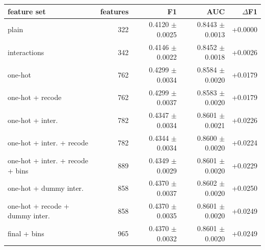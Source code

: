 \begin{tabular}{lrrrr}
\toprule
feature set & features & F1 & AUC & $\Delta$F1 \\
\midrule
plain & 322 & 0.4120 $\pm$ 0.0025 & 0.8443 $\pm$ 0.0013 & +0.0000 \\
interactions & 342 & 0.4146 $\pm$ 0.0022 & 0.8452 $\pm$ 0.0018 & +0.0026 \\
one-hot & 762 & 0.4299 $\pm$ 0.0034 & 0.8584 $\pm$ 0.0020 & +0.0179 \\
one-hot + recode & 762 & 0.4299 $\pm$ 0.0037 & 0.8583 $\pm$ 0.0020 & +0.0179 \\
one-hot + inter. & 782 & 0.4347 $\pm$ 0.0034 & 0.8601 $\pm$ 0.0021 & +0.0226 \\
one-hot + inter. + recode & 782 & 0.4344 $\pm$ 0.0034 & 0.8600 $\pm$ 0.0020 & +0.0224 \\
one-hot + inter. + recode + bins & 889 & 0.4349 $\pm$ 0.0029 & 0.8601 $\pm$ 0.0020 & +0.0229 \\
one-hot + dummy inter. & 858 & 0.4370 $\pm$ 0.0037 & 0.8602 $\pm$ 0.0020 & +0.0250 \\
one-hot + recode + dummy inter. & 858 & 0.4370 $\pm$ 0.0035 & 0.8601 $\pm$ 0.0020 & +0.0249 \\
final + bins & 965 & 0.4370 $\pm$ 0.0032 & 0.8601 $\pm$ 0.0020 & +0.0249 \\
\bottomrule
\end{tabular}
